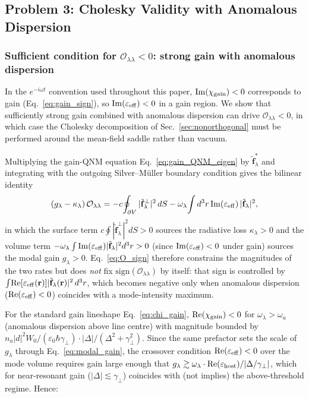 \documentclass[12pt]{article}
\newcommand{\tf}{\tilde{\mathbf{f}}}
\begin{document}
\subsection{Problem 3: Cholesky Validity with Anomalous Dispersion}
\label{sec:cholesky_validity}

\subsubsection*{Sufficient condition for $\mathcal{O}_{\lambda\lambda} < 0$:
strong gain with anomalous dispersion}

In the $e^{-i\omega t}$ convention used throughout this paper,
$\mathrm{Im}(\chi_{\rm gain})<0$ corresponds to gain
(Eq.~\ref{eq:gain_sign}), so $\mathrm{Im}(\varepsilon_{\rm eff})<0$
in a gain region.  We show that sufficiently strong gain combined with
anomalous dispersion can drive $\mathcal{O}_{\lambda\lambda}<0$, in
which case the Cholesky decomposition of Sec.~\ref{sec:nonorthogonal}
must be performed around the mean-field saddle rather than vacuum.

Multiplying the gain-QNM equation Eq.~\eqref{eq:gain_QNM_eigen} by
$\tf_\lambda^*$ and integrating with the outgoing Silver--M\"uller
boundary condition gives the bilinear identity
\begin{equation}
  (g_\lambda-\kappa_\lambda)\,\mathcal{O}_{\lambda\lambda}
  = -c\!\oint_{\partial V}|\tf_\lambda^\perp|^2\,dS
  -\omega_\lambda\!\int d^3r\,
  \mathrm{Im}(\varepsilon_{\rm eff})\,|\tf_\lambda|^2,
  \label{eq:O_sign}
\end{equation}
in which the surface term $c\oint|\tf_\lambda^\perp|^2 dS>0$ sources
the radiative loss $\kappa_\lambda>0$ and the volume term
$-\omega_\lambda\int\mathrm{Im}(\varepsilon_{\rm eff})|\tf_\lambda|^2
d^3r>0$ (since $\mathrm{Im}(\varepsilon_{\rm eff})<0$ under gain)
sources the modal gain $g_\lambda>0$.  Eq.~\eqref{eq:O_sign} therefore
constrains the magnitudes of the two rates but does \emph{not} fix
$\mathrm{sign}(\mathcal{O}_{\lambda\lambda})$ by itself: that sign is
controlled by $\int\!\mathrm{Re}[\varepsilon_{\rm eff}(\mathbf{r})]
|\tf_\lambda(\mathbf{r})|^2\,d^3r$, which becomes negative only when
anomalous dispersion ($\mathrm{Re}(\varepsilon_{\rm eff})<0$) coincides
with a mode-intensity maximum.

For the standard gain lineshape Eq.~\eqref{eq:chi_gain},
$\mathrm{Re}(\chi_{\rm gain})<0$ for $\omega_\lambda>\omega_a$
(anomalous dispersion above line centre) with magnitude bounded by
$n_a|d|^2 W_0/(\varepsilon_0\hbar\gamma_\perp)\cdot|\Delta|/(\Delta^2+\gamma_\perp^2)$.
Since the same prefactor sets the scale of $g_\lambda$ through
Eq.~\eqref{eq:modal_gain}, the crossover condition
$\mathrm{Re}(\varepsilon_{\rm eff})<0$ over the mode volume requires
gain large enough that $g_\lambda\gtrsim\omega_\lambda\cdot
\mathrm{Re}(\varepsilon_{\rm host})/|\Delta/\gamma_\perp|$, which for
near-resonant gain ($|\Delta|\lesssim\gamma_\perp$) coincides with
(not implies) the above-threshold regime.  Hence:
\end{document}
